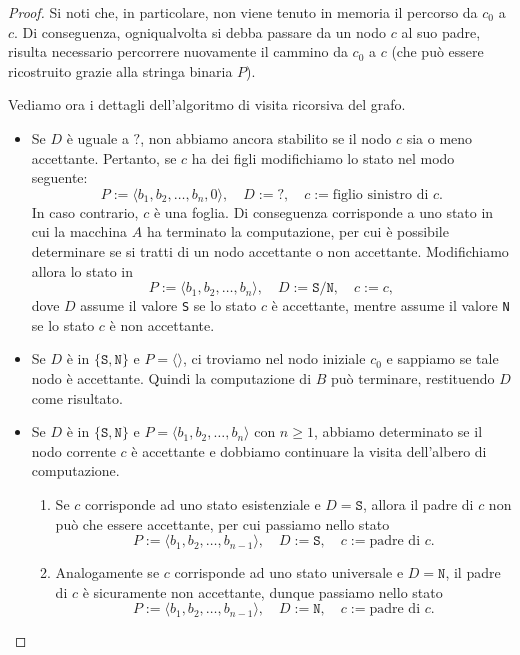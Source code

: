 \begin{proof}
 Si noti che, in particolare, non viene tenuto in memoria il percorso da $c_0$ a $c$.
 Di conseguenza, ogniqualvolta si debba passare da un nodo $c$ al suo padre,
 risulta necessario percorrere nuovamente il cammino da $c_0$ a $c$ (che può essere
 ricostruito grazie alla stringa binaria $P$).
 
 Vediamo ora i dettagli dell'algoritmo di visita ricorsiva del grafo.
 \begin{itemize}
  \item  Se $D$ è uguale a $\texttt{?}$, non abbiamo ancora stabilito se il nodo $c$ sia o meno
  accettante. Pertanto, se $c$ ha dei figli modifichiamo lo stato nel modo seguente:
  \[ P := \langle b_1, b_2, \ldots, b_n, 0 \rangle, \quad D := \texttt{?}, \quad c := \text{figlio sinistro di $c$}. \]
  In caso contrario, $c$ è una foglia. Di conseguenza corrisponde a uno stato in cui la macchina $A$
  ha terminato la computazione, per cui è possibile determinare se si tratti di un
  nodo accettante o non accettante. Modifichiamo allora lo stato in
  \[ P := \langle b_1, b_2, \ldots, b_n \rangle, \quad D := \texttt{S}/\texttt{N}, \quad c := c, \]
  dove $D$ assume il valore \texttt{S} se lo stato $c$ è accettante, mentre assume il valore \texttt{N} se lo stato $c$
  è non accettante.
  
  \item Se $D$ è in $\{\texttt{S}, \texttt{N}\}$ e $P=\langle\rangle$, ci troviamo nel nodo iniziale $c_0$ e sappiamo se tale nodo è accettante. Quindi la computazione di $B$ può terminare, restituendo $D$ come risultato.
  
  \item Se $D$ è in $\{\texttt{S}, \texttt{N}\}$ e $P=\langle b_1, b_2, \ldots, b_n\rangle$ con $n\geq 1$, abbiamo determinato se il nodo corrente $c$ è accettante e dobbiamo continuare la visita dell'albero di computazione.
  \begin{enumerate}
    \item Se $c$ corrisponde ad uno stato esistenziale e $D=\texttt{S}$, allora il padre di $c$ non può che essere accettante, per cui passiamo nello stato
    \[ P := \langle b_1, b_2, \ldots, b_{n-1} \rangle, \quad D := \texttt{S}, \quad c := \text{padre di $c$}. \]
    
    \item Analogamente se $c$ corrisponde ad uno stato universale e $D=\texttt{N}$, il padre di $c$ è sicuramente non accettante, dunque passiamo nello stato
    \[ P := \langle b_1, b_2, \ldots, b_{n-1} \rangle, \quad D := \texttt{N}, \quad c := \text{padre di $c$}. \]
    

\end{enumerate}
\end{itemize}
\end{proof}
